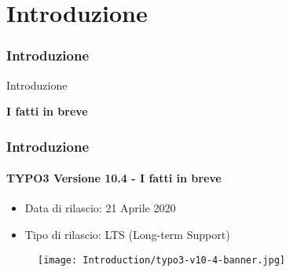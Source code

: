 %

\section{Introduzione}
\begin{frame}[fragile]
	\frametitle{Introduzione}

	\begin{center}\huge{Introduzione}\end{center}
	\begin{center}\huge{\color{typo3darkgrey}\textbf{I fatti in breve}}\end{center}

\end{frame}


\begin{frame}[fragile]
	\frametitle{Introduzione}
	\framesubtitle{TYPO3 Versione 10.4 - I fatti in breve}

	\begin{itemize}
		\item Data di rilascio: 21 Aprile 2020
		\item Tipo di rilascio: LTS (Long-term Support)
	\end{itemize}

	\begin{figure}
		\texttt{[image: Introduction/typo3-v10-4-banner.jpg]}
	\end{figure}

\end{frame}


